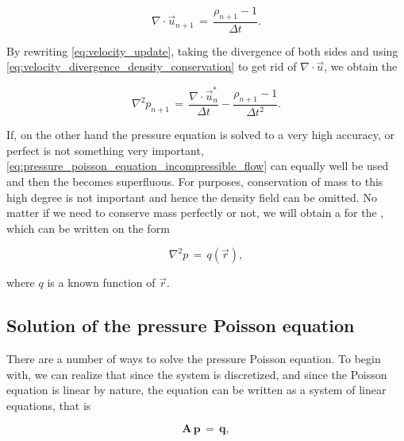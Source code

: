\begin{equation} \label{eq:velocity_divergence_density_conservation}
\nabla\cdot\vec{u}_{n+1} \,=\, \frac{\rho_{n+1}-1}{\Delta t}.
\end{equation}

By rewriting \eqref{eq:velocity_update}, taking the divergence of both sides and using \eqref{eq:velocity_divergence_density_conservation} to get rid of $\nabla\cdot\vec{u}$, we obtain the 

\begin{equation} \label{eq:pressure_poisson_equation_density_conservation}
\nabla^2 p_{n+1} \,=\, \frac{\nabla\cdot\vec{u}^*_n}{\Delta t} - \frac{\rho_{n+1} - 1}{\Delta t^2}.
\end{equation}

If, on the other hand the pressure equation is solved to a very high accuracy, or perfect  is not something very important, \eqref{eq:pressure_poisson_equation_incompressible_flow} can equally well be used and then the  becomes superfluous. For \simulation purposes, conservation of mass to this high degree is not important and hence the density field can be omitted. No matter if we need to conserve mass perfectly or not, we will obtain a  for the , which can be written on the form

\begin{equation} \label{eq:pressure_poisson_equation_general}
\nabla^2 p \,=\, q(\vec{r}),
\end{equation}

where $q$ is a known function of $\vec{r}$.

\subsection{Solution of the pressure Poisson equation}

\label{sec:pressure_poisson_equation_solution}

There are a number of ways to solve the pressure Poisson equation. To begin with, we can realize that since the system is discretized, and since the Poisson equation is linear by nature, the equation can be written as a system of linear equations, that is

\begin{equation} \label{eq:pressure_poisson_equation_matrix}
\mathbf{A\,p} \,=\, \mathbf{q},
\end{equation}

